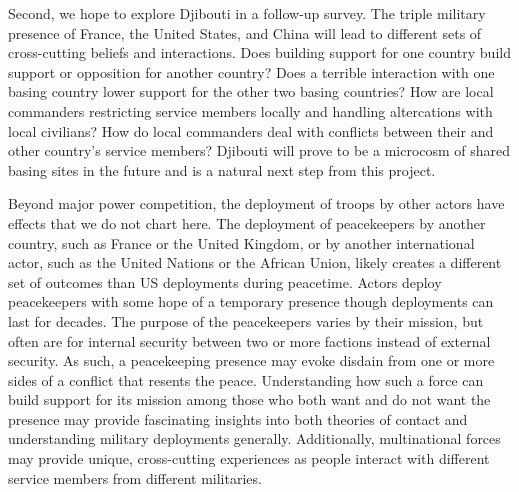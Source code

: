 Second, we hope to explore Djibouti in a follow-up survey. The triple military presence of France, the United States, and China will lead to different sets of cross-cutting beliefs and interactions. Does building support for one country build support or opposition for another country? Does a terrible interaction with one basing country lower support for the other two basing countries? How are local commanders restricting service members locally and handling altercations with local civilians? How do local commanders deal with conflicts between their and other country's service members? Djibouti will prove to be a microcosm of shared basing sites in the future and is a natural next step from this project. %

Beyond major power competition, the deployment of troops by other actors have effects that we do not chart here. The deployment of peacekeepers by another country, such as France or the United Kingdom, or by another international actor, such as the United Nations or the African Union, likely creates a different set of outcomes than US deployments during peacetime. Actors deploy peacekeepers with some hope of a temporary presence though deployments can last for decades. The purpose of the peacekeepers varies by their mission, but often are for internal security between two or more factions instead of external security. As such, a peacekeeping presence may evoke disdain from one or more sides of a conflict that resents the peace. Understanding how such a force can build support for its mission among those who both want and do not want the presence may provide fascinating insights into both theories of contact and understanding military deployments generally. Additionally, multinational forces may provide unique, cross-cutting experiences as people interact with different service members from different militaries. %

